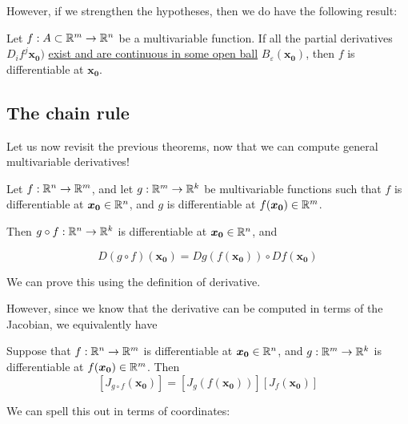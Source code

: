 However, if we strengthen the hypotheses, then we do have the following result:
    
    \begin{theorem}
    Let  $f : A \subset \mathbb{R}^m \to \mathbb{R}^n$ be a multivariable function.  If all the partial derivatives $D_if^j\bm{x_0})$ \underline{exist and are continuous in some open ball} $B_\varepsilon(\bm{x_0})$, then $f$ is differentiable at $\bm{x_0}$.
    \end{theorem}

\subsection{The chain rule}

Let us now revisit the previous theorems, now that we can compute general multivariable derivatives!

\begin{theorem}
    Let $f : \mathbb{R}^n \to \mathbb{R}^m$, and let $g: \mathbb{R}^m \to \mathbb{R}^k$ be multivariable functions such that $f$ is differentiable at $\bm{x_0} \in \mathbb{R}^n$, and $g$ is differentiable at $f(\bm{x_0}) \in \mathbb{R}^m$.
    
    \vspace{1em}
    Then $g \circ f : \mathbb{R}^n \to \mathbb{R}^k$ is differentiable at $\bm{x_0} \in \mathbb{R}^n$, and 
    
    $$D(g \circ f)(\bm{x_0}) = Dg(f(\bm{x_0})) \circ Df(\bm{x_0})$$
    
    \end{theorem}

We can prove this using the definition of derivative.

However, since we know that the derivative can be computed in terms of the Jacobian, we equivalently have

    \begin{theorem}
        Suppose that $f : \mathbb{R}^n \to \mathbb{R}^m$ is differentiable at $\bm{x_0} \in \mathbb{R}^n$, and $g: \mathbb{R}^m \to \mathbb{R}^k$ is differentiable at $f(\bm{x_0}) \in \mathbb{R}^m$.   Then
    $$[J_{g\circ f}(\bm{x_0})] =\left[J_g(f(\bm{x_0}))\right][J_f(\bm{x_0})]$$
    \end{theorem}

We can spell this out in terms of coordinates:


